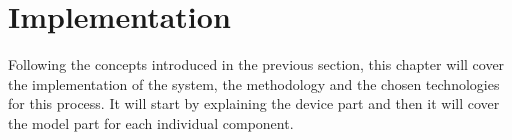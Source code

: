 


\chapter{Implementation}
\label{cha:Implementation}

Following the concepts introduced in the previous section, this chapter will cover the implementation of the system, the methodology and the chosen technologies for this process.  It will start by explaining the device part and then it will cover the model part for each individual component.









